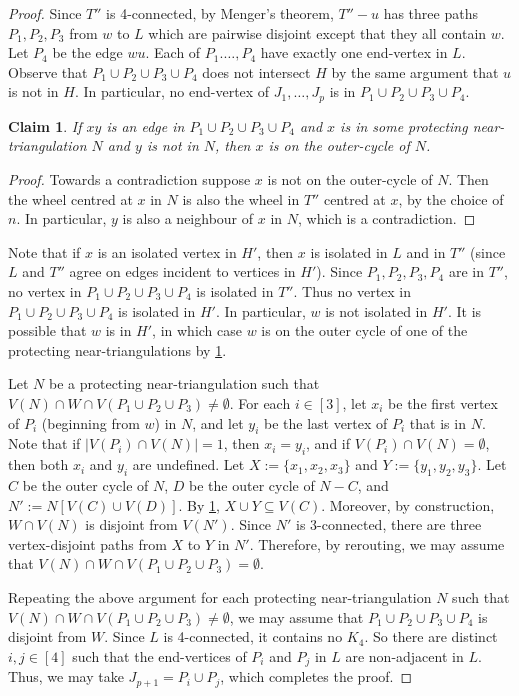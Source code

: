 \documentclass[a4paper,11pt]{article}
\theoremstyle{plain}
\newtheorem{claim}{Claim}[thm]
\theoremstyle{definition}
\begin{document}
\begin{proof}
Since $T''$ is 4-connected, by Menger's theorem, $T''-u$ has three paths $P_1,P_2,P_3$ from $w$ to $L$ which are pairwise disjoint except that they all contain $w$. Let $P_4$ be the edge $wu$. Each of $P_1.\dots,P_4$ have exactly one end-vertex in $L$. Observe that $P_1 \cup P_2 \cup P_3 \cup P_4$ does not intersect $H$ by the same argument that $u$ is not in $H$.  In particular, no end-vertex of $J_1, \dots, J_p$ is in $P_1 \cup P_2 \cup P_3 \cup P_4$.

\begin{claim}
\label{OnOuterCycle}
If $xy$ is an edge in $P_1\cup P_2 \cup P_3 \cup P_4$ and $x$ is in some protecting near-triangulation $N$ and $y$ is not in $N$, then $x$ is on the outer-cycle of $N$.
\end{claim}

\begin{proof}
Towards a contradiction suppose $x$ is not on the outer-cycle of $N$.  Then the wheel centred at $x$ in $N$ is also the wheel in $T''$ centred at $x$, by the choice of $n$. In particular, $y$ is also a neighbour of $x$ in $N$, which is a contradiction.   
\end{proof}

Note that if $x$ is an isolated vertex in $H'$, then $x$ is isolated in $L$ and in $T''$ (since $L$ and $T''$ agree on edges incident to vertices in $H'$). Since $P_1,P_2,P_3,P_4$ are in $T''$, no vertex in $P_1\cup P_2 \cup P_3 \cup P_4$ is isolated in $T''$. Thus no vertex in $P_1\cup P_2 \cup P_3 \cup P_4$ is isolated in $H'$. In particular, $w$ is not isolated in $H'$. It is possible that $w$ is in $H'$, in which case $w$ is on the outer cycle of one of the protecting near-triangulations by \cref{OnOuterCycle}.

Let $N$ be a protecting near-triangulation such that $V(N) \cap W \cap V(P_1 \cup P_2 \cup P_3) \neq \emptyset$. For each $i \in [3]$, let $x_i$ be the first vertex of $P_i$ (beginning from $w$) in $N$, and let $y_i$ be the last vertex of $P_i$ that is in $N$.  Note that if $|V(P_i) \cap V(N)|=1$, then $x_i=y_i$, and if $V(P_i) \cap V(N)=\emptyset$, then both $x_i$ and $y_i$ are undefined.  Let $X:=\{x_1, x_2, x_3\}$ and $Y:=\{y_1, y_2, y_3\}$.  Let $C$ be the outer cycle of $N$, $D$ be the outer cycle of $N -C$, and $N':=N[V(C) \cup V(D)]$.   By \cref{OnOuterCycle}, $X \cup Y \subseteq V(C)$.  Moreover, by construction, $W \cap V(N)$ is disjoint from $V(N')$.  Since $N'$ is $3$-connected, there are three vertex-disjoint paths from $X$ to $Y$ in $N'$. Therefore, by rerouting, we may assume that $V(N) \cap W \cap V(P_1 \cup P_2 \cup P_3) = \emptyset$. 

Repeating the above argument for each protecting near-triangulation $N$ such that $V(N) \cap W \cap V(P_1 \cup P_2 \cup P_3) \neq \emptyset$, we may assume that $P_1 \cup P_2 \cup P_3 \cup P_4$ is disjoint from $W$. Since $L$ is 4-connected, it contains no $K_4$. So there are distinct $i,j\in [4]$ such that the end-vertices of $P_i$ and $P_j$ in $L$ are non-adjacent in $L$. Thus, we may take $J_{p+1}=P_i\cup P_j$, which completes the proof.
\end{proof}
\end{document}
